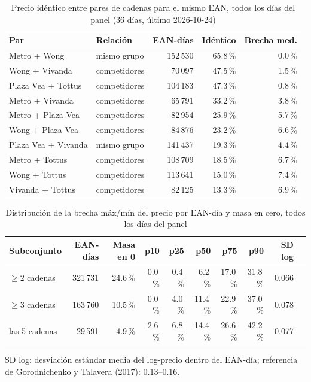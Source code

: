 
\begin{table}[htbp]
\caption{Precio id\'entico entre pares de cadenas para el mismo EAN, todos los d\'ias del panel (36 d\'ias, \'ultimo 2026-10-24)}
\label{tab:identidad}
\centering\scriptsize\setlength{\tabcolsep}{3pt}
\begin{tabular}{@{}llrrr@{}}
\toprule
Par & Relaci\'on & EAN-d\'ias & Id\'entico & Brecha med. \\
\midrule
Metro + Wong & mismo grupo & 152\,530 & 65.8\,\% & 0.0\,\% \\
Wong + Vivanda & competidores & 70\,097 & 47.5\,\% & 1.5\,\% \\
Plaza Vea + Tottus & competidores & 104\,183 & 47.3\,\% & 0.8\,\% \\
Metro + Vivanda & competidores & 65\,791 & 33.2\,\% & 3.8\,\% \\
Metro + Plaza Vea & competidores & 82\,954 & 25.9\,\% & 5.7\,\% \\
Wong + Plaza Vea & competidores & 84\,876 & 23.2\,\% & 6.6\,\% \\
Plaza Vea + Vivanda & mismo grupo & 141\,437 & 19.3\,\% & 4.4\,\% \\
Metro + Tottus & competidores & 108\,709 & 18.5\,\% & 6.7\,\% \\
Wong + Tottus & competidores & 113\,641 & 15.0\,\% & 7.4\,\% \\
Vivanda + Tottus & competidores & 82\,125 & 13.3\,\% & 6.9\,\% \\
\bottomrule\end{tabular}\end{table}

\begin{table}[t]
\caption{Distribuci\'on de la brecha m\'ax/m\'in del precio por EAN-d\'ia y masa en cero, todos los d\'ias del panel}
\label{tab:brecha}
\centering\scriptsize\setlength{\tabcolsep}{4pt}
\begin{tabular}{@{}lrrrrrrrrr@{}}
\toprule
Subconjunto & EAN-d\'ias & Masa en 0 & p10 & p25 & p50 & p75 & p90 & SD log \\
\midrule
$\geq 2$ cadenas & 321\,731 & 24.6\,\% & 0.0\,\% & 0.4\,\% & 6.2\,\% & 17.0\,\% & 31.8\,\% & 0.066 \\
$\geq 3$ cadenas & 163\,760 & 10.5\,\% & 0.0\,\% & 4.0\,\% & 11.4\,\% & 22.9\,\% & 37.0\,\% & 0.078 \\
las 5 cadenas & 29\,591 & 4.9\,\% & 2.6\,\% & 6.8\,\% & 14.4\,\% & 26.6\,\% & 42.2\,\% & 0.077 \\
\bottomrule\end{tabular}
\par\smallskip\raggedright\scriptsize SD log: desviaci\'on est\'andar media del log-precio dentro del EAN-d\'ia; referencia de Gorodnichenko y Talavera (2017): 0.13--0.16.
\end{table}


